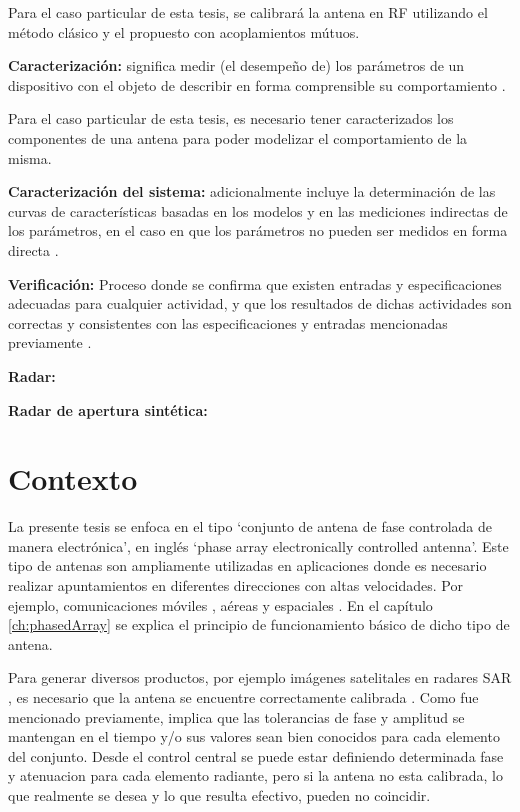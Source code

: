 Para el caso particular de esta tesis, se calibrará la antena en RF utilizando el método clásico y el propuesto con 
acoplamientos mútuos.

{\textbf{Caracterización:}} significa medir (el desempeño de) los parámetros de un dispositivo con el objeto de describir en
forma comprensible su comportamiento \cite{Mittermayer2007}.

Para el caso particular de esta tesis, es necesario tener caracterizados los componentes de una antena para poder modelizar el 
comportamiento de la misma.

{\textbf{Caracterización del sistema:}} adicionalmente incluye la determinación de las curvas de características basadas
en los modelos y en las mediciones indirectas de los parámetros, en el caso en que los parámetros no pueden ser medidos
en forma directa \cite{Mittermayer2007}.

{\textbf{Verificación:}} Proceso donde se confirma que existen entradas y especificaciones adecuadas para cualquier actividad,
y que los resultados de dichas actividades son correctas y consistentes con las especificaciones y entradas mencionadas 
previamente \cite{Division2009}.

{\textbf{Radar:}}

{\textbf{Radar de apertura sintética:}}


\section{Contexto} \label{sc:context}

La presente tesis se enfoca en el tipo \enquote*{conjunto de antena de fase controlada de manera electrónica}, en inglés
\enquote*{phase array electronically controlled antenna}. Este tipo de antenas son ampliamente utilizadas en aplicaciones donde 
es necesario realizar apuntamientos en diferentes direcciones con altas velocidades. Por ejemplo, comunicaciones móviles 
\cite{Chen2012}, aéreas \cite{MHong1989} y espaciales \cite{Shimada1995}\cite{Makhoul2012}. En el capítulo \ref{ch:phasedArray}
se explica el principio de funcionamiento básico de dicho tipo de antena.

Para generar diversos productos, por ejemplo imágenes satelitales en radares SAR \cite{Freeman1992}, es necesario que la
antena se encuentre correctamente calibrada \cite{Luscombe1990}\cite{Seifert1996}\cite{Dall1994}. Como fue mencionado 
previamente, implica que las tolerancias de fase y amplitud se mantengan en el tiempo y/o sus valores sean bien conocidos para
cada elemento del conjunto. Desde el control central se puede estar definiendo determinada fase y atenuacion para cada elemento
radiante, pero si la antena no esta calibrada, lo que realmente se desea y lo que resulta efectivo, pueden no coincidir.


